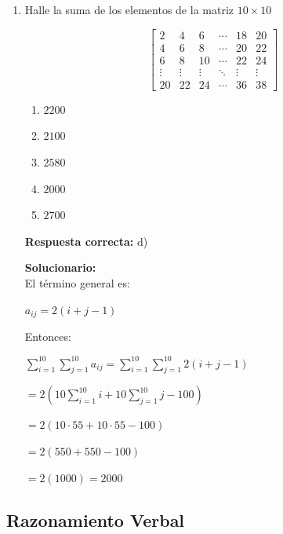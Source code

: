 \begin{enumerate}
	\item Halle la suma de los elementos de la matriz $10\times10$
	
	\[
	\begin{bmatrix}
		2 & 4 & 6 & \cdots & 18 & 20\\
		4 & 6 & 8 & \cdots & 20 & 22\\
		6 & 8 & 10 & \cdots & 22 & 24\\
		\vdots & \vdots & \vdots & \ddots & \vdots & \vdots\\
		20 & 22 & 24 & \cdots & 36 & 38
	\end{bmatrix}
	\]
	
	\begin{enumerate}[label=\alph*)]
		\item $2200$
		\item $2100$
		\item $2580$
		\item $2000$
		\item $2700$
	\end{enumerate}
	\textbf{Respuesta correcta:} d)
	
	\vspace{2mm}
	\textbf{Solucionario:}\\
	El término general es:
	
	$a_{ij}=2(i+j-1)$
	
	Entonces:
	
	$\displaystyle \sum_{i=1}^{10}\sum_{j=1}^{10} a_{ij}
	=\sum_{i=1}^{10}\sum_{j=1}^{10}2(i+j-1)$
	
	$=2\left(10\sum_{i=1}^{10}i+10\sum_{j=1}^{10}j-100\right)$
	
	$=2(10\cdot55+10\cdot55-100)$
	
	$=2(550+550-100)$
	
	$=2(1000)=2000$
	
	
	\vspace{6mm}
	
\end{enumerate}

\subsection*{Razonamiento Verbal}

